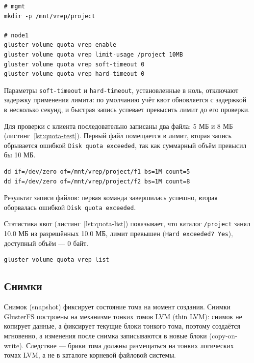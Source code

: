 \begin{lstlisting}[caption={Включение квот и установка лимита (mgmt, node1)}, label={lst:quota-set}]
# mgmt
mkdir -p /mnt/vrep/project

# node1
gluster volume quota vrep enable
gluster volume quota vrep limit-usage /project 10MB
gluster volume quota vrep soft-timeout 0
gluster volume quota vrep hard-timeout 0
\end{lstlisting}

Параметры \texttt{soft-timeout} и \texttt{hard-timeout}, установленные
в ноль, отключают задержку применения лимита: по умолчанию учёт
квот обновляется с задержкой в несколько секунд, и быстрая запись
успевает превысить лимит до его проверки.

Для проверки с клиента последовательно записаны два файла: 5 МБ и
8 МБ (листинг~\ref{lst:quota-test}). Первый файл помещается в лимит,
вторая запись обрывается ошибкой \texttt{Disk quota exceeded},
так как суммарный объём превысил бы 10 МБ.

\begin{lstlisting}[caption={Проверка квоты (mgmt)}, label={lst:quota-test}]
dd if=/dev/zero of=/mnt/vrep/project/f1 bs=1M count=5
dd if=/dev/zero of=/mnt/vrep/project/f2 bs=1M count=8
\end{lstlisting}

Результат записи файлов:
первая команда завершилась успешно, вторая оборвалась ошибкой
\texttt{Disk quota exceeded}.


Статистика квот (листинг~\ref{lst:quota-list}) показывает, что каталог
\texttt{/project} занял 10.0 МБ из разрешённых 10.0 МБ, лимит
превышен (\texttt{Hard exceeded? Yes}), доступный объём --- 0 байт.


\begin{lstlisting}[caption={Статистика квот (node1)}, label={lst:quota-list}]
gluster volume quota vrep list
\end{lstlisting}


\subsection{Снимки}

Снимок (snapshot) фиксирует состояние тома на момент создания.
Снимки GlusterFS построены на механизме тонких томов LVM
(thin LVM): снимок не копирует данные, а фиксирует текущие блоки
тонкого тома, поэтому создаётся мгновенно, а изменения после
снимка записываются в новые блоки (copy-on-write). Следствие ---
брики тома должны размещаться на тонких логических томах LVM,
а не в каталоге корневой файловой системы.

